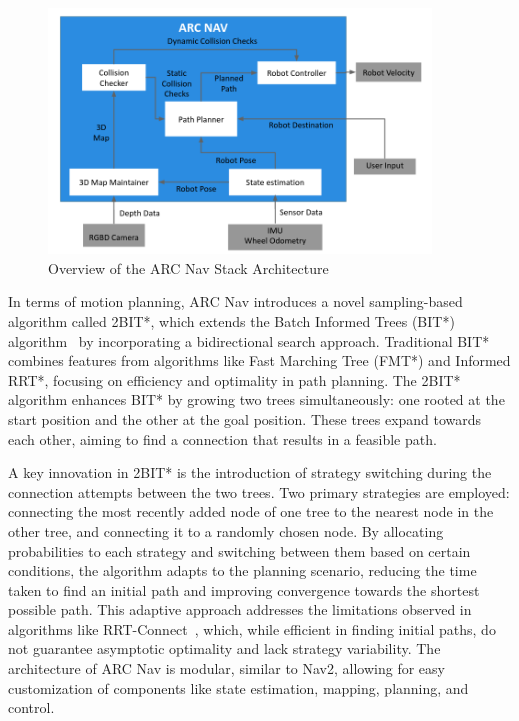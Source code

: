 \vspace{0.7em}
\begin{figure}[H]
    \centering
    \includegraphics[width=4.0in ]{pics/arc_nav.png}
    \caption[Overview of the ARC Nav Stack Architecture]{Overview of the ARC Nav Stack Architecture~\cite{vishwas2021arc}}\label{arc4}
\end{figure}




\noindent In terms of motion planning, ARC Nav introduces a novel sampling-based algorithm called 2BIT*, which extends the Batch Informed
Trees (BIT*) algorithm~\cite{gammell2015bit} by incorporating a bidirectional search approach. Traditional BIT* combines features
from algorithms like Fast Marching Tree (FMT*) and Informed RRT*, focusing on efficiency and optimality in path planning. The 2BIT* algorithm
enhances BIT* by growing two trees simultaneously: one rooted at the start position and the other at the goal position. These trees expand towards each other, aiming to find a connection that results in a feasible path.

\noindent A key innovation in 2BIT* is the introduction of strategy switching during the connection attempts between the two trees.
Two primary strategies are employed: connecting the most recently added node of one tree to the nearest node in the other
tree, and connecting it to a randomly chosen node. By allocating probabilities to each strategy and switching between them
based on certain conditions, the algorithm adapts to the planning scenario, reducing the time taken to find an initial
path and improving convergence towards the shortest possible path. This adaptive approach addresses the 
limitations observed in algorithms like RRT-Connect~\cite{Kuffner2000RRTconnectAE}, which, while efficient in finding initial
paths, do not guarantee asymptotic optimality and lack strategy variability. 
The architecture of ARC Nav is modular, similar to Nav2, allowing for easy customization of components like state estimation,
mapping, planning, and control. 



